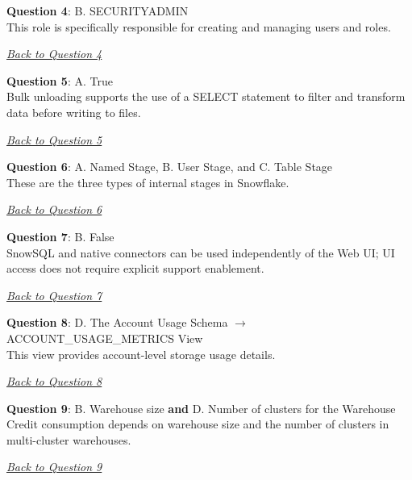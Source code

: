\documentclass[12pt]{article}
\newcommand{\answer}[2]{%
  \textbf{Question #1}\label{ans:#1}: #2\par
  \smallskip\emph{\hyperref[q:#1]{Back to Question #1}}\par\medskip
}
\begin{document}
\answer{4}{B. SECURITYADMIN\\
This role is specifically responsible for creating and managing users and roles.}

\answer{5}{A. True\\
Bulk unloading supports the use of a SELECT statement to filter and transform data before writing to files.}

\answer{6}{A. Named Stage, B. User Stage, and C. Table Stage\\
These are the three types of internal stages in Snowflake.}

\answer{7}{B. False\\
SnowSQL and native connectors can be used independently of the Web UI; UI access does not require explicit support enablement.}

\answer{8}{D. The Account Usage Schema $\rightarrow$ ACCOUNT\_USAGE\_METRICS View\\
This view provides account-level storage usage details.}

\answer{9}{B. Warehouse size \textbf{and} D. Number of clusters for the Warehouse\\
Credit consumption depends on warehouse size and the number of clusters in multi-cluster warehouses.}
\end{document}
